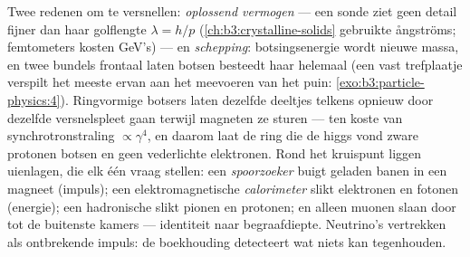 \begin{remark}\label{rem:b3:particle-physics:machines}
Twee redenen om te versnellen: \emph{oplossend vermogen} --- een sonde ziet geen
detail fijner dan haar golflengte $\lambda = h/p$
(\cref{ch:b3:crystalline-solids} gebruikte ångströms; femtometers
kosten \unit{GeV}'s) --- en \emph{schepping}: botsingsenergie
wordt nieuwe massa, en twee bundels frontaal laten botsen besteedt haar helemaal
(een vast trefplaatje verspilt het meeste ervan aan het meevoeren van het puin:
\cref{exo:b3:particle-physics:4}). Ringvormige botsers laten dezelfde
deeltjes telkens opnieuw door dezelfde versnelspleet gaan terwijl
magneten ze sturen --- ten koste van synchrotronstraling
$\propto\gamma^4$, en daarom laat de ring die de higgs vond
zware protonen botsen en geen vederlichte elektronen. Rond het
kruispunt liggen uienlagen, die elk één vraag stellen: een
\emph{spoorzoeker} buigt geladen banen in een magneet (impuls); een
elektromagnetische \emph{calorimeter} slikt elektronen en
fotonen (energie); een hadronische slikt pionen en protonen;
en alleen muonen slaan door tot de buitenste kamers ---
identiteit naar begraafdiepte. Neutrino's vertrekken als ontbrekende
impuls: de boekhouding detecteert wat niets kan tegenhouden.
\end{remark}


